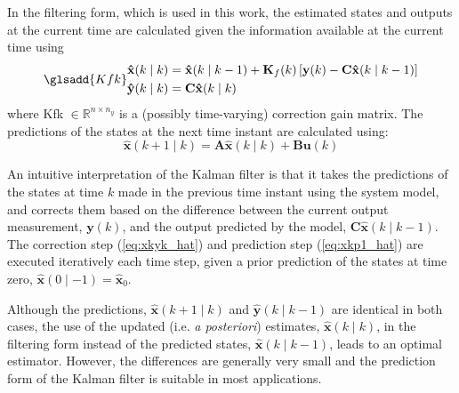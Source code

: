 In the filtering form, which is used in this work, the estimated states and outputs at the current time are calculated given the information available at the current time using
\begin{equation} \label{eq:xkyk_hat} \glsadd{Kfk}
	\begin{aligned}
		\mathbf{\hat{x}}(k \mid k) &= \mathbf{\hat{x}}(k \mid k-1) + \mathbf{K}_f(k) \left[\mathbf{y}(k) - 	\mathbf{C} \mathbf{\hat{x}}(k \mid k-1)\right] \\
		\mathbf{\hat{y}}(k \mid k) &= \mathbf{C} \mathbf{\hat{x}}(k \mid k)
	\end{aligned}
\end{equation}
where \gls{Kfk} $\in \mathbb{R}^{n \times n_y}$ is a (possibly time-varying) correction gain matrix. The predictions of the states at the next time instant are calculated using:
\begin{equation} \label{eq:xkp1_hat}
	\mathbf{\hat{x}}(k+1 \mid k) = \mathbf{A} \mathbf{\hat{x}}(k \mid k) + \mathbf{B} \mathbf{u}(k)
\end{equation}

An intuitive interpretation of the Kalman filter is that it takes the predictions of the states at time $k$ made in the previous time instant using the system model, and corrects them based on the difference between the current output measurement, $\mathbf{y}(k)$, and the output predicted by the model, $\mathbf{C} \mathbf{\hat{x}}(k \mid k-1)$. The correction step (\ref{eq:xkyk_hat}) and prediction step (\ref{eq:xkp1_hat}) are executed iteratively each time step, given a prior prediction of the states at time zero, $\mathbf{\hat{x}}(0 \mid -1)=\mathbf{\hat{x}}_0$.

Although the predictions, $\mathbf{\hat{x}}(k+1 \mid k)$ and $\mathbf{\hat{y}}(k \mid k-1)$ are identical in both cases, the use of the updated (i.e. \textit{a posteriori}) estimates, $\mathbf{\hat{x}}(k \mid k)$, in the filtering form instead of the predicted states, $\mathbf{\hat{x}}(k \mid k-1)$, leads to an optimal estimator. However, the differences are generally very small and the prediction form of the Kalman filter is suitable in most applications.

